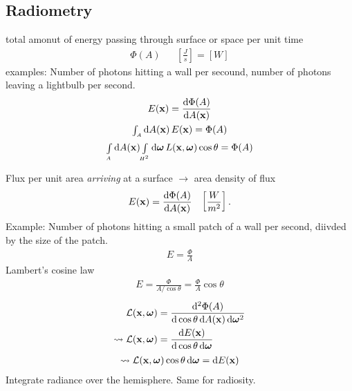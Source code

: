 \begin{compactdesc}
	\section{Radiometry}
		\item[\lp{flux}]
			total amonut of energy passing through surface or space per unit time
			\begin{align*}
				\Phi(A)&&\left[ \frac{J}{s} \right]=[ W ]
			\end{align*}
			examples: Number of photons hitting a wall per secound, number of photons leaving a lightbulb per second.
			\begin{gather*}
				E(\vtr{x})=\dv{\Phi(A)}{A(\vtr{x})}\\
				{\scriptstyle\int_{A}^{}}\dd{A(\vtr{x})}\,E(\vtr{x})=\Phi(A)\\
				{\scriptstyle\int\limits_{A}^{}}\dd{A}(\vtr{x}){\scriptstyle\int\limits_{H^2}^{}}\dd{\vtr{\omega}}\, L(\vtr{x},\vtr{\omega})\cos\theta=\Phi(A)
			\end{gather*}
		\item[\lp{irradiance}]
			Flux per unit area \emph{arriving} at a surface $\to$ area density of flux
			\begin{align*}
				E(\bm{\mathrm{x}})=\frac{\mathrm d \Phi(A)}{\mathrm d A(\bm{\mathrm{x}})} &&\left[ \frac{W}{m^2} \right].
			\end{align*}
			Example: Number of photons hitting a small patch of a wall per second, diivded by the size of the patch.
	\begin{gather*}
		E=\frac{\Phi}{A}
	\end{gather*}
	Lambert's cosine law
	\begin{gather*}
		E=\frac{\Phi}{A/\cos\theta}=\frac{\Phi}{A}\cos\theta
	\end{gather*}
	\begin{align*}
		\mathcal{L}(\vtr{x},\vtr{\omega})&=\dvt{\Phi(A)}{\cos\theta\dd{A}(\vtr{x})\dd{\vtr{\omega}}}\\\\
		\leadsto\mathcal{L}(\vtr{x},\vtr{\omega})&=\dv{E(\vtr{x})}{\cos\theta \dd{\vtr{\omega}}}
	\end{align*}
	\begin{gather*}
		\leadsto\mathcal{L}(\vtr{x},\vtr{\omega})\cos\theta\dd{\vtr{\omega}}=\dd{E(\vtr{x})}
	\end{gather*}
	Integrate radiance over the hemisphere. Same for radiosity.
		\item[\lp{radiosity}]

\end{compactdesc}
